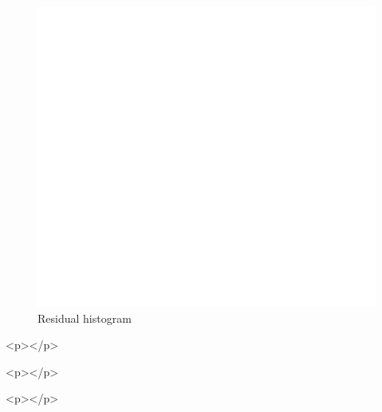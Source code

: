 \documentclass[a4paper,man,hidelinks,floatsintext]{apa7}
\begin{document}
    \begin{figure}[htbp]\caption{Residual histogram}
\label{fig:Figure_4}
\centering
\includegraphics[width=\columnwidth]{figure_4.pdf}
\end{figure}
      
        <p></p>
      
    
      
      
    
      
        <p></p>
      
    
      
      
    
      
        <p></p>









\end{document}
